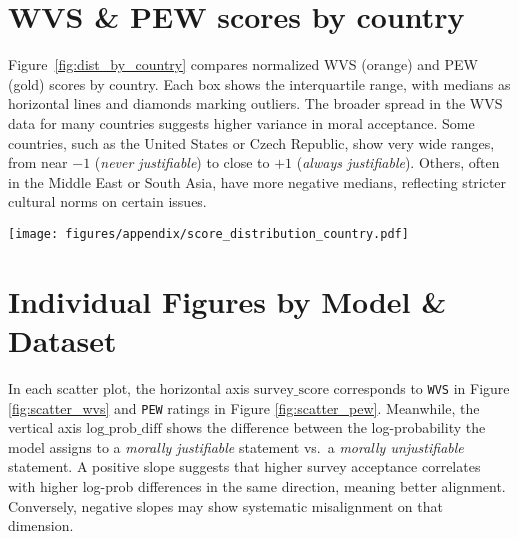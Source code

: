 \documentclass[11pt]{article}
\begin{document}
\section{WVS \& PEW scores by country}
\label{appendix:WVS_PEW_scores_by_country}
Figure~\ref{fig:dist_by_country} compares normalized WVS (orange) and PEW (gold) scores by country. Each box shows the interquartile range, with medians as horizontal lines and diamonds marking outliers. The broader spread in the WVS data for many countries suggests higher variance in moral acceptance. Some countries, such as the United States or Czech Republic, show very wide ranges, from near \(-1\) (\emph{never justifiable}) to close to \(+1\) (\emph{always justifiable}). Others, often in the Middle East or South Asia, have more negative medians, reflecting stricter cultural norms on certain issues.

\begin{figure*}[ht]
\centering
\begin{minipage}{\textwidth} %
    \centering
    \texttt{[image: figures/appendix/score\_distribution\_country.pdf]}
    \vspace{-15pt}
    \caption{\small Distribution of normalized WVS (orange) and PEW (gold) survey scores by country.}
    \label{fig:dist_by_country}
\end{minipage}
\end{figure*}


\section{Individual Figures by Model \& Dataset}

In each scatter plot, the horizontal axis \(\text{survey\_score}\) corresponds to \texttt{WVS} in Figure \ref{fig:scatter_wvs} and \texttt{PEW} ratings in Figure \ref{fig:scatter_pew}. Meanwhile, the vertical axis \(\text{log\_prob\_diff}\) shows the difference between the log-probability the model assigns to a \emph{morally justifiable} statement vs.\ a \emph{morally unjustifiable} statement. A positive slope suggests that higher survey acceptance correlates with higher log-prob differences in the same direction, meaning better alignment. Conversely, negative slopes may show systematic misalignment on that dimension.
\end{document}
